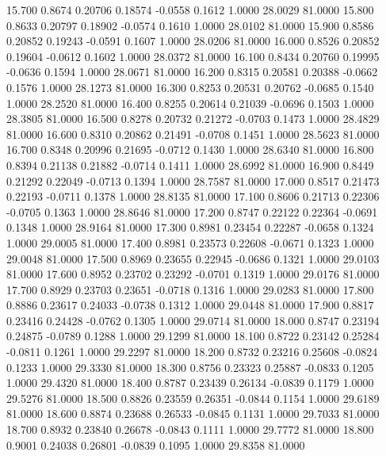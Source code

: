   15.700   0.8674   0.20706   0.18574  -0.0558   0.1612   1.0000  28.0029  81.0000
  15.800   0.8633   0.20797   0.18902  -0.0574   0.1610   1.0000  28.0102  81.0000
  15.900   0.8586   0.20852   0.19243  -0.0591   0.1607   1.0000  28.0206  81.0000
  16.000   0.8526   0.20852   0.19604  -0.0612   0.1602   1.0000  28.0372  81.0000
  16.100   0.8434   0.20760   0.19995  -0.0636   0.1594   1.0000  28.0671  81.0000
  16.200   0.8315   0.20581   0.20388  -0.0662   0.1576   1.0000  28.1273  81.0000
  16.300   0.8253   0.20531   0.20762  -0.0685   0.1540   1.0000  28.2520  81.0000
  16.400   0.8255   0.20614   0.21039  -0.0696   0.1503   1.0000  28.3805  81.0000
  16.500   0.8278   0.20732   0.21272  -0.0703   0.1473   1.0000  28.4829  81.0000
  16.600   0.8310   0.20862   0.21491  -0.0708   0.1451   1.0000  28.5623  81.0000
  16.700   0.8348   0.20996   0.21695  -0.0712   0.1430   1.0000  28.6340  81.0000
  16.800   0.8394   0.21138   0.21882  -0.0714   0.1411   1.0000  28.6992  81.0000
  16.900   0.8449   0.21292   0.22049  -0.0713   0.1394   1.0000  28.7587  81.0000
  17.000   0.8517   0.21473   0.22193  -0.0711   0.1378   1.0000  28.8135  81.0000
  17.100   0.8606   0.21713   0.22306  -0.0705   0.1363   1.0000  28.8646  81.0000
  17.200   0.8747   0.22122   0.22364  -0.0691   0.1348   1.0000  28.9164  81.0000
  17.300   0.8981   0.23454   0.22287  -0.0658   0.1324   1.0000  29.0005  81.0000
  17.400   0.8981   0.23573   0.22608  -0.0671   0.1323   1.0000  29.0048  81.0000
  17.500   0.8969   0.23655   0.22945  -0.0686   0.1321   1.0000  29.0103  81.0000
  17.600   0.8952   0.23702   0.23292  -0.0701   0.1319   1.0000  29.0176  81.0000
  17.700   0.8929   0.23703   0.23651  -0.0718   0.1316   1.0000  29.0283  81.0000
  17.800   0.8886   0.23617   0.24033  -0.0738   0.1312   1.0000  29.0448  81.0000
  17.900   0.8817   0.23416   0.24428  -0.0762   0.1305   1.0000  29.0714  81.0000
  18.000   0.8747   0.23194   0.24875  -0.0789   0.1288   1.0000  29.1299  81.0000
  18.100   0.8722   0.23142   0.25284  -0.0811   0.1261   1.0000  29.2297  81.0000
  18.200   0.8732   0.23216   0.25608  -0.0824   0.1233   1.0000  29.3330  81.0000
  18.300   0.8756   0.23323   0.25887  -0.0833   0.1205   1.0000  29.4320  81.0000
  18.400   0.8787   0.23439   0.26134  -0.0839   0.1179   1.0000  29.5276  81.0000
  18.500   0.8826   0.23559   0.26351  -0.0844   0.1154   1.0000  29.6189  81.0000
  18.600   0.8874   0.23688   0.26533  -0.0845   0.1131   1.0000  29.7033  81.0000
  18.700   0.8932   0.23840   0.26678  -0.0843   0.1111   1.0000  29.7772  81.0000
  18.800   0.9001   0.24038   0.26801  -0.0839   0.1095   1.0000  29.8358  81.0000
